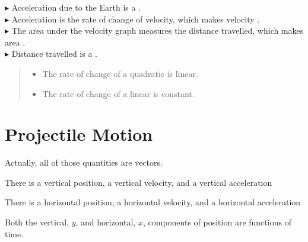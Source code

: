\documentclass{ximera}
\begin{document}
\begin{summary}
$\blacktriangleright$ Acceleration due to the Earth is a . \\

$\blacktriangleright$ Acceleration is the rate of change of velocity, which makes velocity . \\

$\blacktriangleright$ The area under the velocity graph measures the distance travelled, which makes area . \\

$\blacktriangleright$ Distance travelled is a . \\




\begin{quote}
\begin{itemize}
\item The rate of change of a quadratic is linear.
\item The rate of change of a linear is constant.
\end{itemize}
\end{quote}



\end{summary}








\section{Projectile Motion}


Actually, all of those quantities are vectors.  

\begin{observation}
\item There is a vertical position, a vertical velocity, and a vertical acceleration
\item There is a horizontal position, a horizontal velocity, and a horizontal acceleration
\end{observation}



Both the vertical, $y$, and horizontal, $x$, components of position are functions of time.
\end{document}
